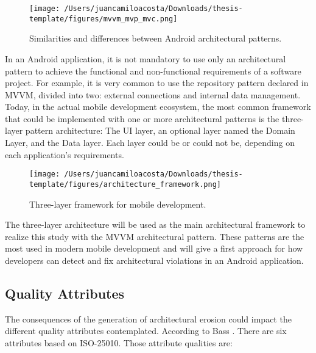 \begin{figure}
    \centering
    \texttt{[image: /Users/juancamiloacosta/Downloads/thesis-template/figures/mvvm\_mvp\_mvc.png]}
    \caption{Similarities and differences between Android architectural patterns. \citet{mvc-mvp-mvvm} }
    \label{fig:concept-map}
\end{figure}


In an Android application, it is not mandatory to use only an architectural pattern to achieve the functional and non-functional requirements of a software project. For example, it is very common to use the repository pattern declared in MVVM, divided into two: external connections and internal data management. Today, in the actual mobile development ecosystem, the most common framework that could be implemented with one or more architectural patterns is the three-layer pattern architecture: The UI layer, an optional layer named the Domain Layer, and the Data layer. Each layer could be or could not be, depending on each application's requirements. 

\begin{figure}
    \centering
    \texttt{[image: /Users/juancamiloacosta/Downloads/thesis-template/figures/architecture\_framework.png]}
    \caption{Three-layer framework for mobile development. \citet{google-architecture} }
    \label{fig:concept-map}
\end{figure}

The three-layer architecture will be used as the main architectural framework to realize this study with the MVVM architectural pattern. These patterns are the most used in modern mobile development and will give a first approach for how developers can detect and fix architectural violations in an Android application.

\subsection{Quality Attributes}
The consequences of the generation of architectural erosion could impact the different quality attributes contemplated. According to Bass \citet{bass-architecture-book}. There are six attributes based on ISO-25010. Those attribute qualities are:

